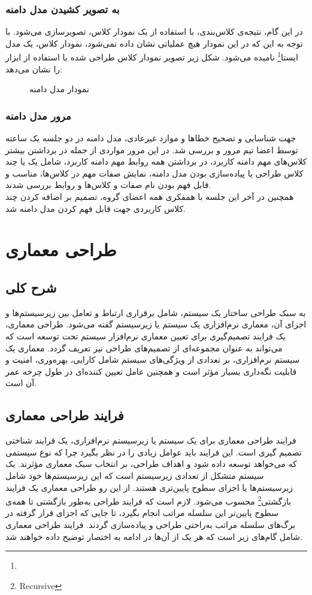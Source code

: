 \documentclass[12pt]{article}
\begin{document}
	\subsubsection{به تصویر کشیدن مدل دامنه}
	در این گام، نتیجه‌ی کلاس‌بندی، با استفاده از یک نمودار کلاس، تصویرسازی می‌شود. با توجه به این که در این نمودار هیچ عملیاتی نشان داده نمی‌شود، نمودار کلاس، یک مدل ایستا\footnote{} نامیده می‌شود. شکل زیر تصویر نمودار کلاس طراحی شده با استفاده از ابزار
	را نشان می‌دهد:
	\begin{figure}
		\centering
		\caption{نمودار مدل دامنه}
		\label{fig:classdiagram}
	\end{figure}

	\newpage
	\subsubsection{مرور مدل دامنه}
	جهت شناسایی و تصحیح خطاها و موارد غیرعادی، مدل دامنه در دو جلسه یک ساعته توسط اعضا تیم مرور و بررسی شد. در این مرور مواردی از جمله در برداشتن بیشتر کلاس‌های مهم دامنه کاربرد، در برداشتن همه‌ روابط مهم دامنه کاربرد، شامل یک یا چند کلاس طراحی یا پیاده‌سازی بودن مدل دامنه، نمایش صفات مهم در کلاس‌ها، مناسب و قابل فهم بودن نام صفات و کلاس‌ها و روابط بررسی شدند.\\
	همچنین در آخر این جلسه با همفکری همه اعضای گروه، تصمیم بر اضافه کردن چند کلاس کاربردی جهت قابل فهم کردن مدل دامنه شد.

	\newpage
	\section{طراحی معماری}
	\subsection{شرح کلی}
	به سبک طراحی ساختار یک سیستم، شامل برقراری ارتباط و تعامل بین زیرسیستم‌ها و اجزای آن، معماری نرم‌افزاری یک سیستم یا زیرسیستم گفته می‌شود. طراحی معماری، یک فرایند تصمیم‌گیری برای تعیین معماری نرم‌افزار سیستم تحت توسعه است که می‌تواند به عنوان مجموعه‌ای از تصمیم‌های طراحی نیز تعریف گردد. معماری یک سیستم نرم‌افزاری، بر تعدادی از ویژگی‌های سیستم شامل کارایی، بهره‌وری، امنیت و قابلیت نگه‌داری بسیار مؤثر است و همچنین عامل تعیین کننده‌ای در طول چرخه عمر آن است.

	\subsection{فرایند طراحی معماری}
	فرایند طراحی معماری برای یک سیستم یا زیرسیستم نرم‌افزاری، یک فرایند شناختی تصمیم گیری است. این فرایند باید عوامل زیادی را در نظر بگیرد چرا که نوع سیستمی که می‌خواهد توسعه داده شود و اهداف طراحی، بر انتخاب سبک معماری مؤثرند. یک سیستم متشکل از تعدادی زیرسیستم است که این زیرسیستم‌ها خود شامل زیرسیستم‌ها یا اجزای سطوح پایین‌تری هستند. از این رو طراحی معماری یک فرایند بازگشتی\footnote{Recursive} محسوب می‌شود. لازم است که فرایند طراحی به‌طور بازگشتی تا همه‌ی سطوح پایین‌تر این سلسله مراتب انجام بگیرد، تا جایی که اجزای قرار گرفته در برگ‌های سلسله مراتب به‌راحتی طراحی و پیاده‌سازی گردند. فرایند طراحی معماری شامل گام‌های زیر است که هر یک از آن‌ها در ادامه به اختصار توضیح داده خواهند شد.
\end{document}
